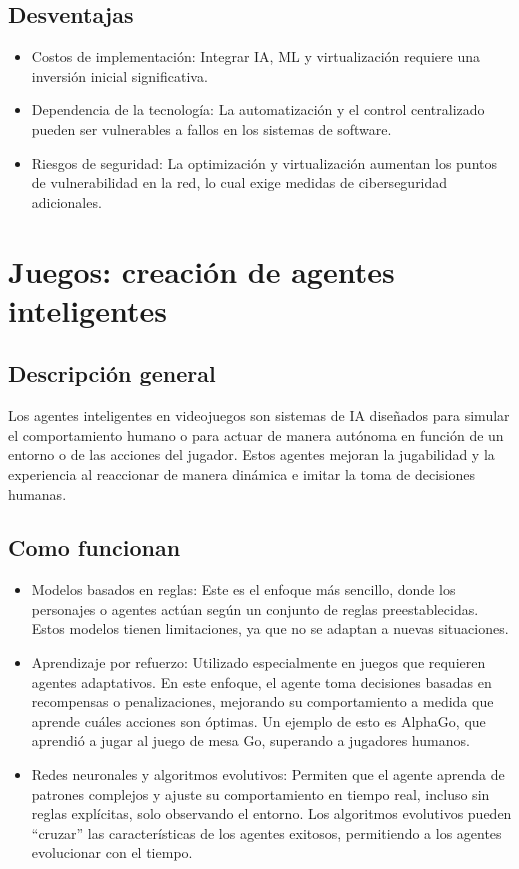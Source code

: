 \documentclass[12pt]{article}
\begin{document}
\subsection{Desventajas}
\begin{itemize}
    \item Costos de implementación: 
    Integrar IA, ML y virtualización requiere una inversión inicial significativa.
    \item Dependencia de la tecnología: 
    La automatización y el control centralizado pueden ser vulnerables a fallos en los sistemas de software.
    \item Riesgos de seguridad: 
    La optimización y virtualización aumentan los puntos de vulnerabilidad en la red, lo cual exige medidas de ciberseguridad adicionales.
\end{itemize}

\section{Juegos: creación de agentes inteligentes}

\subsection{Descripción general}
Los agentes inteligentes en videojuegos son sistemas de IA diseñados para simular el comportamiento humano o para actuar de manera
autónoma en función de un entorno o de las acciones del jugador. Estos agentes mejoran la jugabilidad y la experiencia al reaccionar 
de manera dinámica e imitar la toma de decisiones humanas.
\subsection{Como funcionan}
\begin{itemize}
    \item Modelos basados en reglas:
    Este es el enfoque más sencillo, donde los personajes o agentes actúan según un conjunto de reglas preestablecidas. 
    Estos modelos tienen limitaciones, ya que no se adaptan a nuevas situaciones.
    \item Aprendizaje por refuerzo: 
    Utilizado especialmente en juegos que requieren agentes adaptativos. 
    En este enfoque, el agente toma decisiones basadas en recompensas o penalizaciones, mejorando su comportamiento a 
    medida que aprende cuáles acciones son óptimas. Un ejemplo de esto es AlphaGo, que aprendió a jugar al juego de mesa Go, 
    superando a jugadores humanos.
    \item Redes neuronales y algoritmos evolutivos: 
    Permiten que el agente aprenda de patrones complejos y ajuste su comportamiento en tiempo real, incluso sin reglas explícitas, 
    solo observando el entorno. Los algoritmos evolutivos pueden “cruzar” las características de los agentes exitosos, permitiendo a 
    los agentes evolucionar con el tiempo.
\end{itemize}
\end{document}

